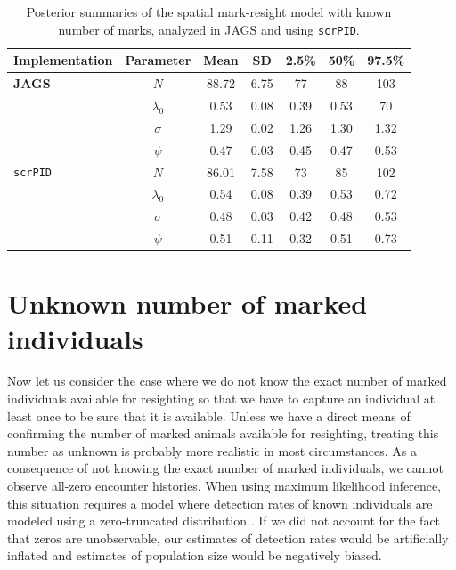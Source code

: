\begin{table}
\label{partialID.tab.knownm}
\centering
  \caption{Posterior summaries of the spatial mark-resight model with known number of marks, analyzed in JAGS and using {\tt scrPID}.}
  \begin{tabular}{lcccccc}
             \hline
  Implementation & Parameter   & Mean  & SD   & 2.5\% & 50\% & 97.5\% \\
           \hline
{\bf JAGS}       & $N$         & 88.72 & 6.75 & 77    & 88   & 103    \\
		 & $\lambda_0$ & 0.53  & 0.08 & 0.39  & 0.53 & 70     \\
		 & $\sigma$    & 1.29  & 0.02 & 1.26  & 1.30 & 1.32   \\
		 & $\psi$      & 0.47  & 0.03 & 0.45  & 0.47 & 0.53   \\
		\hline
{\tt scrPID}     & $N$         & 86.01 & 7.58 & 73    & 85   & 102    \\
		 & $\lambda_0$ & 0.54  & 0.08 & 0.39  & 0.53 & 0.72   \\
		 & $\sigma$    & 0.48  & 0.03 & 0.42  & 0.48 & 0.53   \\
		 & $\psi$      & 0.51  & 0.11 & 0.32  & 0.51 & 0.73   \\
			\hline
  \end{tabular}
\end{table}


\section {Unknown number of marked individuals}
\label{partialID.sec.unknown}
Now let us consider the case where we do not know the exact number of
marked individuals available for resighting so that we have to capture
an individual at least once to be sure that it is available. Unless we
have a direct means of confirming the number of marked animals
available for resighting, treating this number as unknown is probably
more realistic
 in most circumstances. As a consequence of not knowing the exact number of marked individuals, we cannot observe all-zero encounter histories. When using maximum likelihood inference, this situation requires a model where detection rates of known individuals are modeled using a zero-truncated distribution \citep{mcclintock_etal:2009biometrics}. If we did not account for the fact that zeros are unobservable, our estimates of detection rates would be artificially inflated and estimates of population size would be negatively biased.

